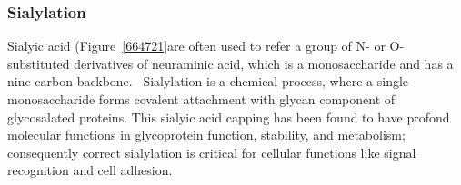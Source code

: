 \subsubsection {Sialylation}
Sialyic acid (Figure~\ref{664721}are often used to refer a group of N- or O-substituted derivatives of neuraminic acid, which is a monosaccharide and has a nine-carbon backbone.~\cite{Vocadlo_2009} Sialylation is a chemical process, where a single monosaccharide forms covalent attachment with glycan component of glycosalated proteins. This sialyic acid capping has been found to have profond molecular functions in glycoprotein function, stability, and metabolism; consequently correct sialylation is critical for cellular functions like signal recognition and cell adhesion.~\cite{Bhide_2016}
